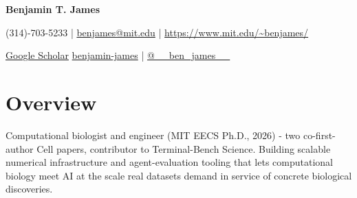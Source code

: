 \documentclass[letter,10pt]{article}
\let\HREF\href
\renewcommand{\href}[2]{\HREF{#1}{\begingroup\UrlFont #2\endgroup}}
\newcommand{\socialicon}[1]{\raisebox{-0.05em}{\resizebox{!}{1em}{#1}}}
\begin{document}
\begin{center}
	{\large\textbf{Benjamin T. James}}
\end{center}
\vspace{-6mm}

\begin{center}
	\small{
		\socialicon{\faPhone} (314)-703-5233 | \socialicon{\faEnvelope} \href{mailto:benjames@mit.edu}{benjames@mit.edu} |
		\socialicon{\faUser} \url{https://www.mit.edu/~benjames/}
	}
\end{center}
\vspace{-6mm}
\begin{center}
	\small{
		\socialicon{\faBookReader} \href{https://scholar.google.com/citations?user=t0y3zRkAAAAJ}{Google Scholar}
		\socialicon{\faGithub} \href{https://github.com/benjamin-james}{benjamin-james} |
		\socialicon{\faTwitter} \href{https://twitter.com/\_\_ben\_james\_\_}{@\_\_ben\_james\_\_}
	}
\end{center}

\vspace{-4mm}

\section{\textbf{Overview}}
\vspace{1mm}
\small{
	Computational biologist and engineer (MIT EECS Ph.D., 2026) - two co-first-author Cell papers, contributor to Terminal-Bench Science.
	Building scalable numerical infrastructure and agent-evaluation tooling that lets computational biology meet AI at the scale real datasets demand in service of concrete biological discoveries.
}
\vspace{-1mm}
\end{document}
